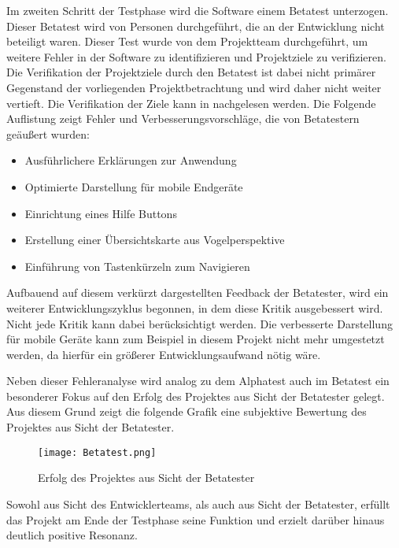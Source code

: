 Im zweiten Schritt der Testphase wird die Software einem Betatest unterzogen. Dieser Betatest wird von Personen
durchgeführt, die an der Entwicklung nicht beteiligt waren. Dieser Test wurde von dem Projektteam durchgeführt,
um weitere Fehler in der Software zu identifizieren und Projektziele zu verifizieren. Die Verifikation der Projektziele
durch den Betatest ist dabei nicht primärer Gegenstand der vorliegenden Projektbetrachtung und wird daher
nicht weiter vertieft. Die Verifikation der Ziele kann in \citet{unternehmensfuehrung2014} nachgelesen werden.
Die Folgende Auflistung zeigt Fehler und Verbesserungsvorschläge, die von Betatestern geäußert wurden:

\begin{itemize}
  \item Ausführlichere Erklärungen zur Anwendung
  \item Optimierte Darstellung für mobile Endgeräte
  \item Einrichtung eines Hilfe Buttons
  \item Erstellung einer Übersichtskarte aus Vogelperspektive
  \item Einführung von Tastenkürzeln zum Navigieren
\end{itemize}

Aufbauend auf diesem verkürzt dargestellten Feedback der Betatester, wird ein weiterer Entwicklungszyklus begonnen, in dem
diese Kritik ausgebessert wird. Nicht jede Kritik kann dabei berücksichtigt werden. Die verbesserte Darstellung für
mobile Geräte kann zum Beispiel in diesem Projekt nicht mehr umgestetzt werden, da hierfür ein größerer
Entwicklungsaufwand nötig wäre.

Neben dieser Fehleranalyse wird analog zu dem Alphatest auch im Betatest ein besonderer Fokus auf den
Erfolg des Projektes aus Sicht der Betatester gelegt. Aus diesem Grund zeigt die folgende Grafik eine subjektive
Bewertung des Projektes aus Sicht der Betatester.

\begin{figure}[htb]
\centering
\texttt{[image: Betatest.png]}
\caption[Alphatest Auswertung]{Erfolg des Projektes aus Sicht der Betatester\protect\footnotemark}
\label{fig:Betatest}
\end{figure}

Sowohl aus Sicht des Entwicklerteams, als auch aus Sicht der Betatester, erfüllt das Projekt am Ende der Testphase
seine Funktion und erzielt darüber hinaus deutlich positive Resonanz.